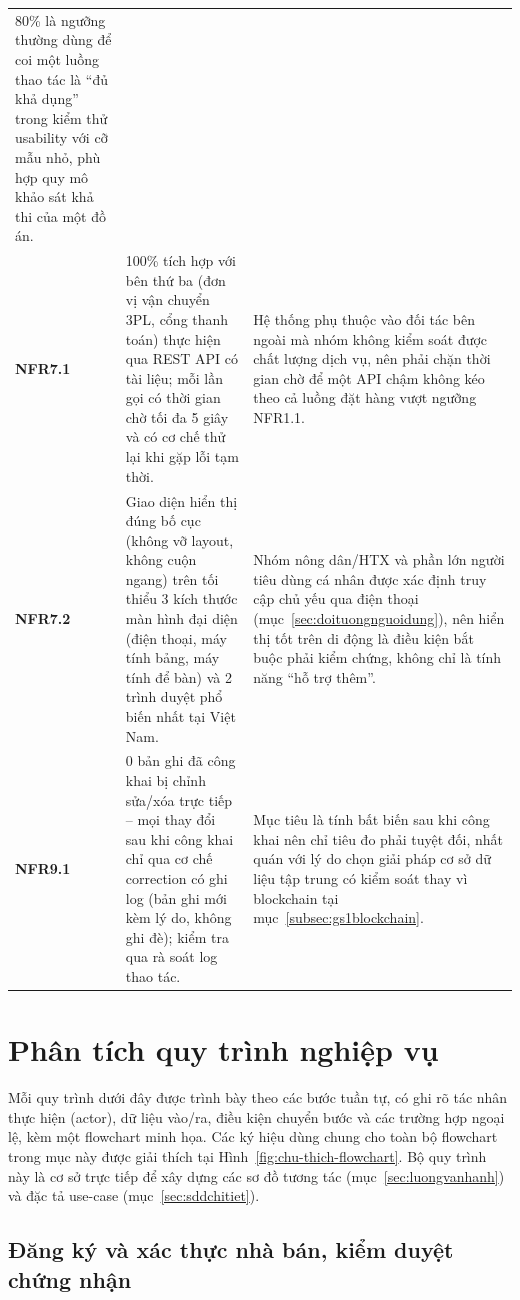 \begin{longtable}{L{1.5cm} L{6.0cm} L{5.9cm}}
80\% là ngưỡng thường dùng để coi một luồng thao tác là ``đủ khả dụng'' trong kiểm thử usability với cỡ mẫu nhỏ, phù hợp quy mô khảo sát khả thi của một đồ án. \\
\textbf{NFR7.1} &
100\% tích hợp với bên thứ ba (đơn vị vận chuyển 3PL, cổng thanh toán) thực hiện qua REST API có tài liệu; mỗi lần gọi có thời gian chờ tối đa 5 giây và có cơ chế thử lại khi gặp lỗi tạm thời. &
Hệ thống phụ thuộc vào đối tác bên ngoài mà nhóm không kiểm soát được chất lượng dịch vụ, nên phải chặn thời gian chờ để một API chậm không kéo theo cả luồng đặt hàng vượt ngưỡng NFR1.1. \\
\textbf{NFR7.2} &
Giao diện hiển thị đúng bố cục (không vỡ layout, không cuộn ngang) trên tối thiểu 3 kích thước màn hình đại diện (điện thoại, máy tính bảng, máy tính để bàn) và 2 trình duyệt phổ biến nhất tại Việt Nam. &
Nhóm nông dân/HTX và phần lớn người tiêu dùng cá nhân được xác định truy cập chủ yếu qua điện thoại (mục~\ref{sec:doituongnguoidung}), nên hiển thị tốt trên di động là điều kiện bắt buộc phải kiểm chứng, không chỉ là tính năng ``hỗ trợ thêm''. \\
\textbf{NFR9.1} &
0 bản ghi đã công khai bị chỉnh sửa/xóa trực tiếp -- mọi thay đổi sau khi công khai chỉ qua cơ chế correction có ghi log (bản ghi mới kèm lý do, không ghi đè); kiểm tra qua rà soát log thao tác. &
Mục tiêu là tính bất biến sau khi công khai nên chỉ tiêu đo phải tuyệt đối, nhất quán với lý do chọn giải pháp cơ sở dữ liệu tập trung có kiểm soát thay vì blockchain tại mục~\ref{subsec:gs1blockchain}. \\
\end{longtable}
\endgroup

\section{Phân tích quy trình nghiệp vụ}
\label{sec:quytrinhnghiepvu}

Mỗi quy trình dưới đây được trình bày theo các bước tuần tự, có ghi rõ tác nhân thực hiện (actor), dữ liệu vào/ra, điều kiện chuyển bước và các trường hợp ngoại lệ, kèm một flowchart minh họa. Các ký hiệu dùng chung cho toàn bộ flowchart trong mục này được giải thích tại Hình~\ref{fig:chu-thich-flowchart}. Bộ quy trình này là cơ sở trực tiếp để xây dựng các sơ đồ tương tác (mục~\ref{sec:luongvanhanh}) và đặc tả use-case (mục~\ref{sec:sddchitiet}).



\subsection{Đăng ký và xác thực nhà bán, kiểm duyệt chứng nhận}

